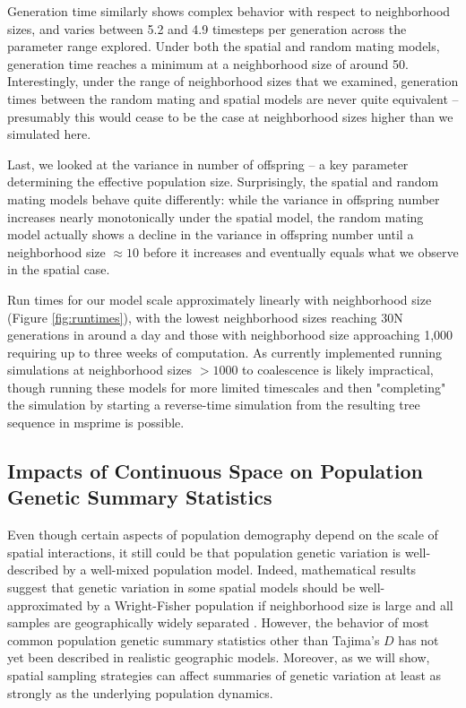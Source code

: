 \documentclass[10pt,twoside,lineno,hidelinks]{preprint}
\begin{document}
Generation time similarly shows complex behavior with respect to neighborhood sizes, and varies between 5.2 and 4.9 timesteps per generation across the parameter range explored. 
Under both the spatial and random mating models, 
generation time reaches a minimum at a neighborhood size of around 50. 
Interestingly, under the range of neighborhood sizes that we examined, generation times between the random mating and spatial models are never quite equivalent -- presumably this would cease to be the case at neighborhood sizes higher than we simulated here.

Last, we looked at the variance in number of offspring -- a key parameter determining the effective population size. 
Surprisingly, the spatial and random mating models behave quite differently: 
while the variance in offspring number increases nearly monotonically under the spatial model, the random mating model actually shows a decline in the variance in offspring number until a neighborhood size $\approx 10$ before it increases and eventually equals what we observe in the spatial case. 

Run times for our model scale approximately linearly with neighborhood size (Figure \ref{fig:runtimes}), with the lowest neighborhood sizes reaching 30N generations in around a day and those with neighborhood size approaching 1,000 requiring up to three weeks of computation. As currently implemented running simulations at neighborhood sizes $>1000$ to coalescence is likely impractical, though running these models for more limited timescales and then "completing" the simulation by starting a reverse-time simulation from the resulting tree sequence in msprime is possible.  


\subsection{Impacts of Continuous Space on Population Genetic Summary Statistics}

Even though certain aspects of population demography depend on the scale of spatial interactions, it still could be that population genetic variation is well-described by a well-mixed population model. Indeed, mathematical results suggest that genetic variation in some spatial models should be well-approximated by a Wright-Fisher population if neighborhood size is large and all samples are geographically widely separated \citep{wilkins2004separation,zahle2005stepping}. However, the behavior of most common population genetic summary statistics other than Tajima's $D$ \citep{Stadler2009} has not yet been described in realistic geographic models. Moreover, as we will show, spatial sampling strategies can affect summaries of genetic variation at least as strongly as the underlying population dynamics. 
\end{document}
